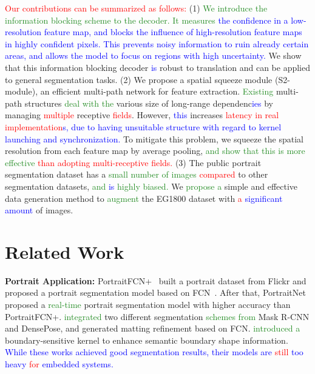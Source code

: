 \documentclass[10pt,twocolumn,letterpaper]{article}
\newcommand\Lars[1]{\textcolor{blue}{#1}}
\newcommand\yj[1]{\textcolor{ForestGreen}{#1}}
\newcommand\nj[1]{\textcolor{red}{#1}}
\newcommand\Lars[1]{#1}
\newcommand\yj[1]{#1}
\newcommand\nj[1]{#1}
\begin{document}
\noindent
\nj{Our contributions can be summarized as follows:}
 (1) \yj{We introduce the information blocking scheme to the decoder.}
\yj{It measures} \Lars{ the confidence in a low-resolution feature map, and blocks the influence of high-resolution feature maps in highly confident pixels. This prevents noisy information to ruin already certain areas, and allows the model to focus on regions with high uncertainty. }
We show that this information blocking decoder \Lars{is} robust to translation and can be applied to general segmentation tasks.
(2) We propose a spatial squeeze module (S2-module), an efficient multi-path network for feature extraction. 
\yj{Existing} multi-path structures \yj{deal with the} various size of long-range dependenc\Lars{ies} by managing \nj{multiple} receptive \nj{fields}.
However, \Lars{this} increases \nj{latency in real implementation}\Lars{s, due to having unsuitable structure with regard to kernel launching and synchronization. } To mitigate this problem, we squeeze the spatial resolution from each feature map by average pooling, \yj{and show that this is more effective} \nj{than adopting multi-receptive fields.} (3) The public portrait segmentation dataset has a \yj{small number of images} \nj{compared} to other  segmentation datasets, \yj{and \Lars{is} highly biased.}
We \yj{propose a} simple and effective data generation method to \yj{augment} the EG1800 dataset with \nj{a} \Lars{significant amount} of images.





 \section{Related Work}
\label{sec:related}



\noindent
\textbf{Portrait Application: } 
PortraitFCN+~\cite{shen2016automatic} built a portrait dataset from Flickr and proposed a portrait segmentation model based on FCN~\cite{long2015fully}.
After that, PortraitNet proposed a \yj{real-time} portrait segmentation model with higher accuracy than PortraitFCN+. 
\cite{orrite2019portrait} \yj{integrated} two different segmentation \yj{schemes} \yj{from} Mask R-CNN and DensePose, and generated matting refinement based on FCN.
\cite{du2019boundary} \yj{introduced a }boundary-sensitive kernel to enhance semantic boundary shape information.
\Lars{While these works achieved good segmentation results, their models are \nj{still} too heavy \nj{for} embedded systems.}
\end{document}
